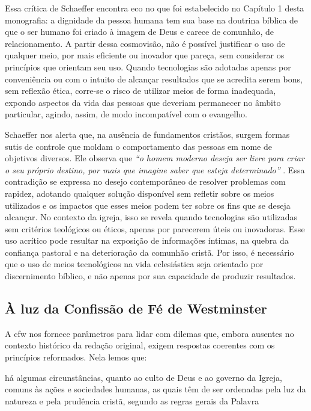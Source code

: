Essa crítica de Schaeffer encontra eco no que foi estabelecido no Capítulo 1 desta monografia: a dignidade da pessoa humana tem sua base na doutrina bíblica de que o ser humano foi criado à imagem de Deus e carece de comunhão, de relacionamento. A partir dessa cosmovisão, não é possível justificar o uso de qualquer meio, por mais eficiente ou inovador que pareça, sem considerar os princípios que orientam seu uso. Quando tecnologias são adotadas apenas por conveniência ou com o intuito de alcançar resultados que se acredita serem bons, sem reflexão ética, corre-se o risco de utilizar meios de forma inadequada, expondo aspectos da vida das pessoas que deveriam permanecer no âmbito particular, agindo, assim, de modo incompatível com o evangelho.

Schaeffer nos alerta que, na ausência de fundamentos cristãos, surgem formas sutis de controle que moldam o comportamento das pessoas em nome de objetivos diversos. Ele observa que \textit{``o homem moderno deseja ser livre para criar o seu próprio destino, por mais que imagine saber que esteja determinado''} \cite[p.~166]{schaeffer2002}. Essa contradição se expressa no desejo contemporâneo de resolver problemas com rapidez, adotando qualquer solução disponível sem refletir sobre os meios utilizados e os impactos que esses meios podem ter sobre os fins que se deseja alcançar. No contexto da igreja, isso se revela quando tecnologias são utilizadas sem critérios teológicos ou éticos, apenas por parecerem úteis ou inovadoras. Esse uso acrítico pode resultar na exposição de informações íntimas, na quebra da confiança pastoral e na deterioração da comunhão cristã. Por isso, é necessário que o uso de meios tecnológicos na vida eclesiástica seja orientado por discernimento bíblico, e não apenas por sua capacidade de produzir resultados.

\subsection{À luz da Confissão de Fé de Westminster}

A \gls{cfw} nos fornece parâmetros para lidar com dilemas que, embora ausentes no contexto histórico da redação original, exigem respostas coerentes com os princípios reformados. Nela lemos que:

\begin{citacao}
    há algumas circunstâncias, quanto ao culto de Deus e ao governo da Igreja, comuns às ações e sociedades humanas, as quais têm de ser ordenadas pela luz da natureza e pela prudência cristã, segundo as regras gerais da Palavra \cite[Cap.~I, §~VI]{cfw}    
\end{citacao}


